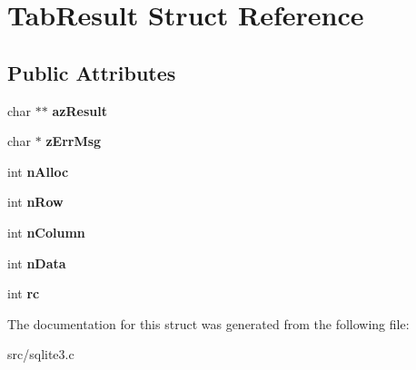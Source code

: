 \hypertarget{struct_tab_result}{\section{Tab\-Result Struct Reference}
\label{struct_tab_result}
}
\subsection*{Public Attributes}
\begin{DoxyCompactItemize}
\item 
\hypertarget{struct_tab_result_a7446a22a7b39c17e447c65ba200490a6}{char $\ast$$\ast$ {\bfseries az\-Result}}\label{struct_tab_result_a7446a22a7b39c17e447c65ba200490a6}

\item 
\hypertarget{struct_tab_result_a6e7104bb622be05f16b6470dbb68a6c7}{char $\ast$ {\bfseries z\-Err\-Msg}}\label{struct_tab_result_a6e7104bb622be05f16b6470dbb68a6c7}

\item 
\hypertarget{struct_tab_result_a6a1d5bc64a1eeef54b56cb2602b663b2}{int {\bfseries n\-Alloc}}\label{struct_tab_result_a6a1d5bc64a1eeef54b56cb2602b663b2}

\item 
\hypertarget{struct_tab_result_ae803d6f07364c9e03bee8abd13056e1b}{int {\bfseries n\-Row}}\label{struct_tab_result_ae803d6f07364c9e03bee8abd13056e1b}

\item 
\hypertarget{struct_tab_result_a44237b9ab33cdbca7a5a158470ebcaa3}{int {\bfseries n\-Column}}\label{struct_tab_result_a44237b9ab33cdbca7a5a158470ebcaa3}

\item 
\hypertarget{struct_tab_result_a959e8dd3348f76e4cdabad9c89ee62d1}{int {\bfseries n\-Data}}\label{struct_tab_result_a959e8dd3348f76e4cdabad9c89ee62d1}

\item 
\hypertarget{struct_tab_result_a44bb015ce660ed3f987e324919d73f4d}{int {\bfseries rc}}\label{struct_tab_result_a44bb015ce660ed3f987e324919d73f4d}

\end{DoxyCompactItemize}


The documentation for this struct was generated from the following file\-:\begin{DoxyCompactItemize}
\item 
src/sqlite3.\-c\end{DoxyCompactItemize}
